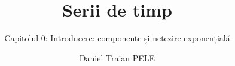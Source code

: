 \title[Serii de timp]{Serii de timp}
\subtitle{Capitolul 0: Introducere: componente și netezire exponențială}
\author[D.T. Pele]{Daniel Traian PELE}
\date{}

\providecommand{\tsaapplink}[3]{\hypertarget{#2}{}\hyperlink{#1}{\beamergotobutton{#3}}}  %
\providecommand{\tsaappback}[2]{\begin{tikzpicture}[remember picture,overlay]\node[anchor=south east] at ([xshift=-3mm,yshift=7mm]current page.south east){\hyperlink{#1}{\beamerreturnbutton{#2}}};\end{tikzpicture}}  %
\providecommand{\tsachlink}[2]{\href{#1}{#2}}  %
\providecommand{\tsachlinkt}[2]{\href{#1}{\usebeamercolor[fg]{frametitle}#2}}  %


